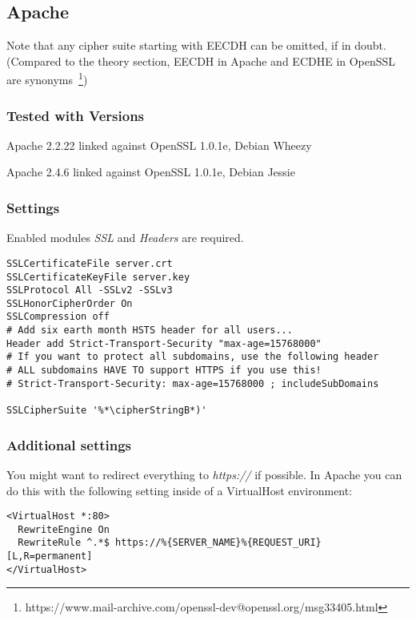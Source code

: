 \subsection{Apache}

Note that any cipher suite starting with EECDH can be omitted, if in doubt.
(Compared to the theory section, EECDH in Apache and ECDHE in OpenSSL are
synonyms~\footnote{https://www.mail-archive.com/openssl-dev@openssl.org/msg33405.html})

\subsubsection{Tested with Versions}
\begin{itemize*}
  \item Apache 2.2.22 linked against OpenSSL 1.0.1e, Debian Wheezy
  \item Apache 2.4.6 linked against OpenSSL 1.0.1e, Debian Jessie
\end{itemize*}

\subsubsection{Settings}
Enabled modules \emph{SSL} and \emph{Headers} are required.

\begin{lstlisting}
SSLCertificateFile server.crt
SSLCertificateKeyFile server.key
SSLProtocol All -SSLv2 -SSLv3 
SSLHonorCipherOrder On
SSLCompression off
# Add six earth month HSTS header for all users...
Header add Strict-Transport-Security "max-age=15768000"
# If you want to protect all subdomains, use the following header
# ALL subdomains HAVE TO support HTTPS if you use this!
# Strict-Transport-Security: max-age=15768000 ; includeSubDomains

SSLCipherSuite '%*\cipherStringB*)'
\end{lstlisting}

\subsubsection{Additional settings}
You might want to redirect everything to \emph{https://} if possible. In Apache
you can do this with the following setting inside of a VirtualHost environment:

\begin{lstlisting}
<VirtualHost *:80>
  RewriteEngine On
  RewriteRule ^.*$ https://%{SERVER_NAME}%{REQUEST_URI} [L,R=permanent]
</VirtualHost>
\end{lstlisting}

